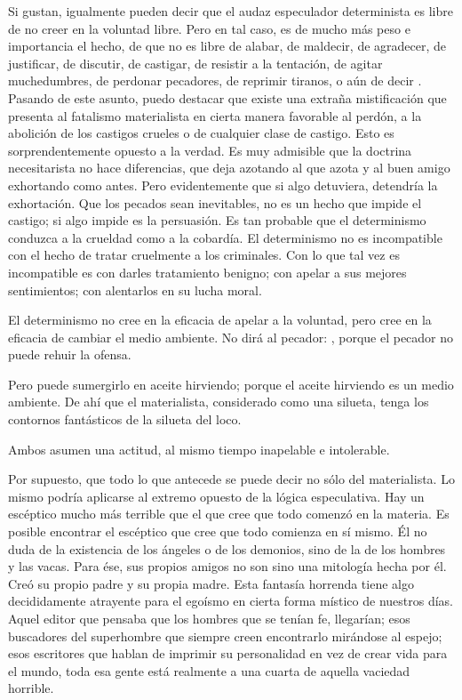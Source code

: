 Si gustan, igualmente pueden decir que el audaz especulador determinista es libre de no creer en la
voluntad libre. Pero en tal caso, es de mucho más peso e importancia el hecho, de que no es libre de
alabar, de maldecir, de agradecer, de justificar, de discutir, de castigar, de resistir a la tentación, de agitar
muchedumbres, de perdonar pecadores, de reprimir tiranos, o aún de decir .
Pasando de este asunto, puedo destacar que existe una extraña mistificación que presenta al
fatalismo materialista en cierta manera favorable al perdón, a la abolición de los castigos crueles o de
cualquier clase de castigo. Esto es sorprendentemente opuesto a la verdad. Es muy admisible que la
doctrina necesitarista no hace diferencias, que deja azotando al que azota y al buen amigo exhortando
como antes. Pero evidentemente que si algo detuviera, detendría la exhortación. Que los pecados sean
inevitables, no es un hecho que impide el castigo; si algo impide es la persuasión. Es tan probable que el
determinismo conduzca a la crueldad como a la cobardía. El determinismo no es incompatible con el
hecho de tratar cruelmente a los criminales. Con lo que tal vez es incompatible es con darles tratamiento
benigno; con apelar a sus mejores sentimientos; con alentarlos en su lucha moral.

El determinismo no cree en la eficacia de apelar a la voluntad, pero cree en la eficacia de cambiar el
medio ambiente. No dirá al pecador: , porque el pecador no puede rehuir la ofensa.

Pero puede sumergirlo en aceite hirviendo; porque el aceite hirviendo es un medio ambiente. De ahí que
el materialista, considerado como una silueta, tenga los contornos fantásticos de la silueta del loco.

Ambos asumen una actitud, al mismo tiempo inapelable e intolerable.

Por supuesto, que todo lo que antecede se puede decir no sólo del materialista. Lo mismo podría
aplicarse al extremo opuesto de la lógica especulativa. Hay un escéptico mucho más terrible que el que
cree que todo comenzó en la materia. Es posible encontrar el escéptico que cree que todo comienza en sí
mismo. Él no duda de la existencia de los ángeles o de los demonios, sino de la de los hombres y las
vacas. Para ése, sus propios amigos no son sino una mitología hecha por él. Creó su propio padre y su
propia madre. Esta fantasía horrenda tiene algo decididamente atrayente para el egoísmo en cierta forma
místico de nuestros días. Aquel editor que pensaba que los hombres que se tenían fe, llegarían; esos
buscadores del superhombre que siempre creen encontrarlo mirándose al espejo; esos escritores que
hablan de imprimir su personalidad en vez de crear vida para el mundo, toda esa gente está realmente a
una cuarta de aquella vaciedad horrible.

